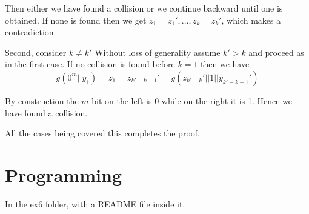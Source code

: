 \documentclass{article}
\begin{document}
\begin{enumerate}
Then either we have found a collision or we continue backward until one is obtained. If none is found then we get $z_1=z_1',\dots,z_k=z_k'$, which makes a contradiction.

Second, consider $k\neq k'$  Without loss of generality assume $k'>k$ and proceed as in the first case. If no collision is found before $k = 1$ then we have $$g(0^m||y_1)=z_1=z_{k'-k+1}'=g(z_{k'-k}'||1||y_{k'-k+1}')$$

By construction the $m$ bit on the left is 0 while on the right it is 1. Hence we have found a collision.

All the cases being covered this completes the proof.

\end{enumerate}

\section{Programming}
In the ex6 folder, with a README file inside it.
\end{document}
